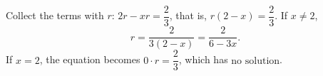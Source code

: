 Collect the terms with $r$: $2r-xr=\dfrac23$, that is, $r(2-x)=\dfrac23$. If $x\ne2$,
\[r=\boxed{\dfrac{2}{3(2-x)}}=\dfrac{2}{6-3x}.\]
If $x=2$, the equation becomes $0\cdot r=\dfrac23$, which has $\boxed{\text{no solution}}$.
